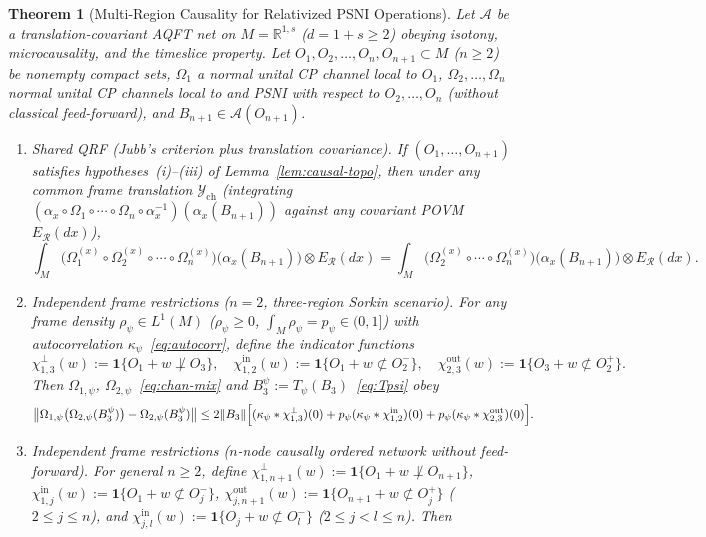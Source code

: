 \documentclass[11pt,a4paper]{article}
\newtheorem{theorem}{Theorem}[section]
\theoremstyle{definition}
\theoremstyle{remark}
\newcommand{\Ac}{\mathcal{A}}
\newcommand{\Rf}{\mathscr{R}}
\newcommand{\RR}{\mathbb{R}}
\newcommand{\one}{\mathbf{1}}
\newcommand{\Y}{\mathcal{Y}}
\newcommand{\norm}[1]{\|#1\|}
\begin{document}
\begin{theorem}[Multi-Region Causality for Relativized PSNI Operations]\label{thm:psni}
Let $\Ac$ be a translation-covariant AQFT net on $M=\RR^{1,s}$ ($d=1+s\ge 2$) obeying isotony, microcausality, and the timeslice property. Let $O_1,O_2,\dots,O_n,O_{n+1}\subset M$ ($n\ge 2$) be nonempty compact sets, $\Omega_1$ a normal unital CP channel local to $O_1$, $\Omega_2,\dots,\Omega_n$ normal unital CP channels local to and PSNI with respect to $O_2,\dots,O_n$ (without classical feed-forward), and $B_{n+1}\in\Ac(O_{n+1})$.
\begin{enumerate}[label=\textup{(\alph*)},leftmargin=*]
\item \emph{Shared QRF (Jubb's criterion plus translation covariance).} If $(O_1,\dots,O_{n+1})$ satisfies hypotheses~\textup{(i)--(iii)} of Lemma~\ref{lem:causal-topo}, then under any common frame translation $\Y_{\mathrm{ch}}$ (integrating $(\alpha_x\circ\Omega_1\circ\cdots\circ\Omega_n\circ\alpha_x^{-1})(\alpha_x(B_{n+1}))$ against any covariant POVM $E_\Rf(dx)$),
\[
\int_M \bigl(\Omega_1^{(x)}\circ\Omega_2^{(x)}\circ\cdots\circ\Omega_n^{(x)}\bigr)\bigl(\alpha_x(B_{n+1})\bigr)\otimes E_\Rf(dx)
= \int_M \bigl(\Omega_2^{(x)}\circ\cdots\circ\Omega_n^{(x)}\bigr)\bigl(\alpha_x(B_{n+1})\bigr)\otimes E_\Rf(dx).
\]
\item \emph{Independent frame restrictions ($n=2$, three-region Sorkin scenario).} For any frame density $\rho_\psi\in L^1(M)$ ($\rho_\psi\ge 0$, $\int_M\rho_\psi = p_\psi\in(0,1]$) with autocorrelation $\kappa_\psi$~\eqref{eq:autocorr}, define the indicator functions
\[
\chi^\perp_{1,3}(w) := \one\{O_1+w \not\perp O_3\}, \quad
\chi^{\mathrm{in}}_{1,2}(w) := \one\{O_1+w \not\subset O_2^-\}, \quad
\chi^{\mathrm{out}}_{2,3}(w) := \one\{O_3+w \not\subset O_2^+\}.
\]
Then $\Omega_{1,\psi}$, $\Omega_{2,\psi}$~\eqref{eq:chan-mix} and $B_3^\psi := T_\psi(B_3)$~\eqref{eq:Tpsi} obey
\begin{equation}\label{eq:psni-n2}
\bigl\|\Omega_{1,\psi}\bigl(\Omega_{2,\psi}(B_3^\psi)\bigr) - \Omega_{2,\psi}(B_3^\psi)\bigr\|
\le 2\norm{B_3}\Bigl[(\kappa_\psi*\chi^\perp_{1,3})(0) + p_\psi(\kappa_\psi*\chi^{\mathrm{in}}_{1,2})(0) + p_\psi(\kappa_\psi*\chi^{\mathrm{out}}_{2,3})(0)\Bigr].
\end{equation}
\item \emph{Independent frame restrictions ($n$-node causally ordered network without feed-forward).} For general $n\ge 2$, define $\chi^\perp_{1,n+1}(w) := \one\{O_1+w\not\perp O_{n+1}\}$, $\chi^{\mathrm{in}}_{1,j}(w) := \one\{O_1+w\not\subset O_j^-\}$, $\chi^{\mathrm{out}}_{j,n+1}(w) := \one\{O_{n+1}+w\not\subset O_j^+\}$ ($2\le j\le n$), and $\chi^{\mathrm{in}}_{j,l}(w) := \one\{O_j+w\not\subset O_l^-\}$ ($2\le j < l \le n$). Then

\end{enumerate}
\end{theorem}
\end{document}
